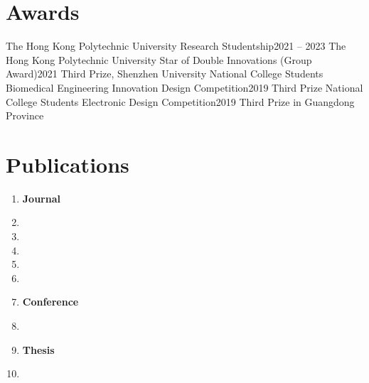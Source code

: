 \documentclass[letterpaper,11pt]{article}
\begin{document}
    \section{Awards}

    \resumeSubHeadingListStart
        \resumeSubheading
            {The Hong Kong Polytechnic University Research Studentship}{2021 -- 2023}
            {The Hong Kong Polytechnic University}{}
        \resumeSubheading
            {Star of Double Innovations (Group Award)}{2021}
            {Third Prize, Shenzhen University}{}
        \resumeSubheading
            {National College Students Biomedical Engineering Innovation Design Competition}{2019}
            {Third Prize}{}
        \resumeSubheading
            {National College Students Electronic Design Competition}{2019}
            {Third Prize in Guangdong Province}{}
    \resumeSubHeadingListEnd

    \section{Publications}
    
    

    \begin{enumerate}[leftmargin=0.15in, label={}, itemsep=0em]
        
        \item \textbf{Journal}
        \item {}
        \item {}
        \item {}
        \item {}
        \item {}
        
        \newpage
        \item \textbf{Conference}
        \item {}

        \item \textbf{Thesis}
        \item {}
     \end{enumerate}

\end{document}
